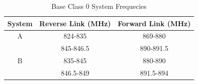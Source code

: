 \begin{table}[htbp]

  \centering

  \caption{Base Class 0 System Frequecies}

\begin{tabular}{|c|c|c|}

\hline

System&Reverse Link (MHz)& Forward Link (MHz)\\

\hline

A&824-835&869-880 \\

&845-846.5 & 890-891.5 \\

\hline

B&835-845&880-890 \\

&846.5-849&891.5-894 \\

\hline

\end{tabular}

  \label{tableintro:1}

\end{table}

